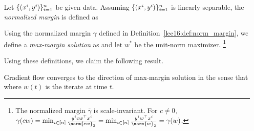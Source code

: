\begin{definition}\label{lec16:def:norm_margin}
Let $\{(x\sp{i}, y\sp{i}) \}_{i=1}^n $ be given data. Assuming $\{(x\sp{i}, y\sp{i}) \}_{i=1}^n$ is linearly separable, the \textit{normalized margin} is defined as
\end{definition}

\begin{definition}
Using the normalized margin $\gamma$ defined in Definition~\ref{lec16:def:norm_margin}, we define a \textit{max-margin solution} as
and let $w^*$ be the unit-norm maximizer. \footnote{The normalized margin $\bar{\gamma}$ is scale-invariant. For $c \neq 0$, $\gamma(cw) = \min_{i \in [n]} \frac{y\sp{i} cw^\top x\sp{i}}{\norm{cw}_2} = \min_{i \in [n]} \frac{y\sp{i} w^\top x\sp{i}}{\norm{w}_2} = \gamma(w)$.}
\end{definition}

Using these definitions, we claim the following result.
\begin{theorem} \label{lec16:thm:maxmargin_gd}
Gradient flow converges to the direction of max-margin solution in the sense that
where $w(t)$ is the iterate at time $t$.
\end{theorem}

